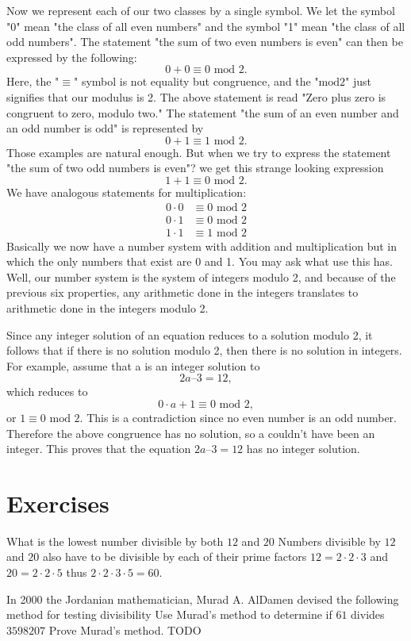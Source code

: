 Now we represent each of our two classes by a single symbol. We let the
symbol "0" mean "the class of all even numbers" and the symbol "1" mean
"the class of all odd numbers". The statement "the sum of two even
numbers is even" can then be expressed by the following:
\[
0 + 0 \equiv 0 \textrm{ mod } 2.
\]
Here, the "$\equiv$" symbol is not equality but congruence, and the
"$\textrm{mod} 2$" just signifies that our modulus is 2. The above statement is
read "Zero plus zero is congruent to zero, modulo two." The statement "the sum
of an even number and an odd number is odd" is represented by
\[
0 + 1 \equiv 1 \textrm{ mod } 2.
\]
Those examples are natural enough. But when we try to express the statement
"the sum of two odd numbers is even"? we get this strange looking expression
\[
1 + 1 \equiv 0 \textrm{ mod } 2.
\]
We have analogous statements for multiplication:
\begin{align*}
0 \cdot 0 &\equiv 0 \textrm{ mod } 2 \\
0 \cdot 1 &\equiv 0 \textrm{ mod } 2 \\
1 \cdot 1 &\equiv 1 \textrm{ mod } 2
\end{align*}
Basically we now have a number system with addition and multiplication but in
which the only numbers that exist are 0 and 1. You may ask what use this has.
Well, our number system is the system of integers modulo 2, and because of the
previous six properties, any arithmetic done in the integers translates to
arithmetic done in the integers modulo 2.

Since any integer solution of an equation reduces to a solution modulo 2, it
follows that if there is no solution modulo 2, then there is no solution in
integers. For example, assume that a is an integer solution to
\[
2a – 3 = 12,
\]
which reduces to
\[
0 \cdot a + 1 \equiv 0 \textrm{ mod } 2,
\]
or $1 \equiv 0 \textrm{ mod } 2$. This is a contradiction since no even number
is an odd number. Therefore the above congruence has no solution, so a couldn't
have been an integer. This proves that the equation $2a – 3 = 12$ has no
integer solution.


\section{Exercises}
\begin{ExerciseList}
\Exercise What is the lowest number divisible by both $12$ and $20$
\Answer Numbers divisible by $12$ and $20$ also have to be divisible by each of
their prime factors $12 = 2 \cdot 2 \cdot 3$ and $20 = 2 \cdot 2 \cdot 5$ thus
$2 \cdot 2 \cdot 3 \cdot 5 = 60$.

\Exercise In 2000 the Jordanian mathematician, Murad A. AlDamen devised the
following method for testing divisibility 
\Question Use Murad's method to determine if $61$ divides $3598207$
\Question Prove Murad's method.
\Answer TODO
\end{ExerciseList}


